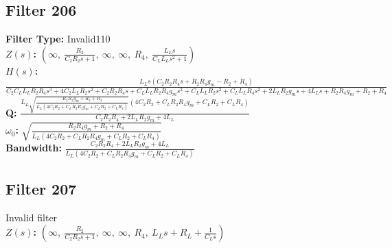 \documentclass{article}
\begin{document}
\subsection*{Filter 206}
\textbf{Filter Type:} Invalid110 \\ 
\textbf{$Z(s)$:} $\left( \infty, \  \frac{R_{2}}{C_{2} R_{2} s + 1}, \  \infty, \  \infty, \  R_{4}, \  \frac{L_{L} s}{C_{L} L_{L} s^{2} + 1}\right)$ \\ 
\textbf{$H(s)$:} $\frac{L_{L} s \left(C_{2} R_{2} R_{4} s + R_{2} R_{4} g_{m} - R_{2} + R_{4}\right)}{C_{2} C_{L} L_{L} R_{2} R_{4} s^{3} + 4 C_{2} L_{L} R_{2} s^{2} + C_{2} R_{2} R_{4} s + C_{L} L_{L} R_{2} R_{4} g_{m} s^{2} + C_{L} L_{L} R_{2} s^{2} + C_{L} L_{L} R_{4} s^{2} + 2 L_{L} R_{2} g_{m} s + 4 L_{L} s + R_{2} R_{4} g_{m} + R_{2} + R_{4}}$ \\ 
\textbf{Q:} $\frac{L_{L} \sqrt{\frac{R_{2} R_{4} g_{m} + R_{2} + R_{4}}{L_{L} \left(4 C_{2} R_{2} + C_{L} R_{2} R_{4} g_{m} + C_{L} R_{2} + C_{L} R_{4}\right)}} \left(4 C_{2} R_{2} + C_{L} R_{2} R_{4} g_{m} + C_{L} R_{2} + C_{L} R_{4}\right)}{C_{2} R_{2} R_{4} + 2 L_{L} R_{2} g_{m} + 4 L_{L}}$ \\ 
\textbf{$\omega_0$:} $\sqrt{\frac{R_{2} R_{4} g_{m} + R_{2} + R_{4}}{L_{L} \left(4 C_{2} R_{2} + C_{L} R_{2} R_{4} g_{m} + C_{L} R_{2} + C_{L} R_{4}\right)}}$ \\ 
\textbf{Bandwidth:} $\frac{C_{2} R_{2} R_{4} + 2 L_{L} R_{2} g_{m} + 4 L_{L}}{L_{L} \left(4 C_{2} R_{2} + C_{L} R_{2} R_{4} g_{m} + C_{L} R_{2} + C_{L} R_{4}\right)}$ \\ 
\subsection*{Filter 207}
Invalid filter \\ 
\textbf{$Z(s)$:} $\left( \infty, \  \frac{R_{2}}{C_{2} R_{2} s + 1}, \  \infty, \  \infty, \  R_{4}, \  L_{L} s + R_{L} + \frac{1}{C_{L} s}\right)$ \\ 
\end{document}
